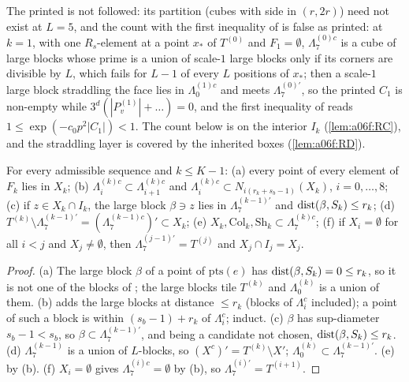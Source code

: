 The printed \cite[Sect.~3C]{Ba2} is not followed: its partition \cite[(3.43)]{Ba2} (cubes with side in $(r,2r)$) need not exist at $L=5$, and the count \cite[(3.45)]{Ba2} with the first inequality of \cite[(3.46)]{Ba2} is false as printed: at $k=1$, with one $R_s$-element at a point $x_*$ of $T^{(0)}$ and $F_1=\emptyset$, $\Lambda^{(0)c}_7$ is a cube of large blocks whose prime is a union of scale-$1$ large blocks only if its corners are divisible by $L$, which fails for $L-1$ of every $L$ positions of $x_*$; then a scale-$1$ large block straddling the face lies in $\Lambda^{(1)c}_0$ and meets $\Lambda^{(0)'}_7$, so the printed $C_1$ is non-empty while $3^d(|P^{(1)}_v|+\dots)=0$, and the first inequality of \cite[(3.46)]{Ba2} reads $1\le\exp(-c_0p^2|C_1|)<1$. The count below is on the interior $I_k$ (\cref{lem:a06f:RC}), and the straddling layer is covered by the inherited boxes (\cref{lem:a06f:RD}).

\begin{lemma}\label{lem:a06f:RE}
For every admissible sequence and $k\le K-1$: \textup{(a)} every point of every element of $F_k$ lies in $X_k$; \textup{(b)} $\Lambda^{(k)c}_i\subset\Lambda^{(k)c}_{i+1}$ and $\Lambda^{(k)c}_i\subset N_{i(r_k+s_b-1)}(X_k)$, $i=0,\dots,8$; \textup{(c)} if $z\in X_k\cap I_k$, the large block $\beta\ni z$ lies in $\Lambda^{(k-1)'}_7$ and $\operatorname{dist}(\beta,S_k)\le r_k$; \textup{(d)} $T^{(k)}\setminus\Lambda^{(k-1)'}_7=(\Lambda^{(k-1)c}_7)'\subset X_k$; \textup{(e)} $X_k,\mathrm{Col}_k,\mathrm{Sh}_k\subset\Lambda^{(k)c}_7$; \textup{(f)} if $X_i=\emptyset$ for all $i<j$ and $X_j\ne\emptyset$, then $\Lambda^{(j-1)'}_7=T^{(j)}$ and $X_j\cap I_j=X_j$.
\end{lemma}

\begin{proof}
(a) The large block $\beta$ of a point of $\mathrm{pts}(e)$ has $\operatorname{dist}(\beta,S_k)=0\le r_k$, so it is not one of the blocks of \cite[p.~570]{Ba2}; the large blocks tile $T^{(k)}$ and $\Lambda^{(k)}_0$ is a union of them. (b) \cite[(2.8)]{Ba2} adds the large blocks at distance $\le r_k$ (blocks of $\Lambda_i^c$ included); a point of such a block is within $(s_b-1)+r_k$ of $\Lambda^c_i$; induct. (c) $\beta$ has sup-diameter $s_b-1<s_b$, so $\beta\subset\Lambda^{(k-1)'}_7$, and being a candidate not chosen, $\operatorname{dist}(\beta,S_k)\le r_k$. (d) $\Lambda^{(k-1)}_7$ is a union of $L$-blocks, so $(X^c)'=T^{(k)}\setminus X'$; $\Lambda^{(k)}_0\subset\Lambda^{(k-1)'}_7$. (e) by (b). (f) $X_i=\emptyset$ gives $\Lambda^{(i)c}_7=\emptyset$ by (b), so $\Lambda^{(i)'}_7=T^{(i+1)}$.
\end{proof}

